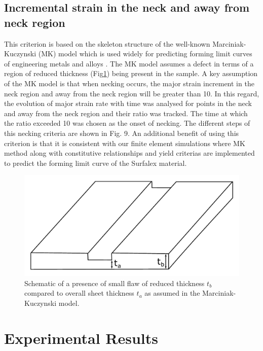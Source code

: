 \documentclass[11pt]{article} %
\begin{document}
\subsection{Incremental strain in the neck and away from neck region}
This criterion is based on the skeleton structure of the well-known Marciniak-Kuczynski (MK) model which is used widely for predicting forming limit curves of engineering metals and alloys \cite{Banabic2010}. The MK model assumes a defect in terms of a region of reduced thickness (Fig\ref{fig:mk_flaw}) being present in the sample. A key assumption of the MK model is that when necking occurs, the major strain increment in the neck region and away from the neck region will be greater than 10\cite{Narasimhan1991}. In this regard, the evolution of major strain rate with time was analysed for points in the neck and away from the neck region and their ratio was tracked. The time at which the ratio exceeded 10 was chosen as the onset of necking. The different steps of this necking criteria are shown in Fig. 9. An additional benefit of using this criterion is that it is consistent with our finite element simulations where MK method along with constitutive relationships and yield criterias are implemented to predict the forming limit curve of the Surfalex material.   

\begin{figure}[h]
	\includegraphics[width=\textwidth]{figures/mk_flaw}
	\centering
	\caption{Schematic of a presence of small flaw of reduced thickness $t_b$ compared to overall sheet thickness $t_a$ as assumed in the Marciniak-Kuczynski model.}
	\label{fig:mk_flaw}
\end{figure}

\section{Experimental Results}
\end{document}
